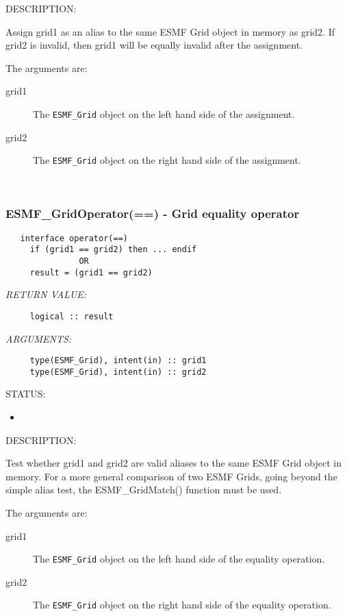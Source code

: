 {\sf DESCRIPTION:\\ }


     Assign grid1 as an alias to the same ESMF Grid object in memory
     as grid2. If grid2 is invalid, then grid1 will be equally invalid after
     the assignment.
  
     The arguments are:
     \begin{description}
     \item[grid1]
       The {\tt ESMF\_Grid} object on the left hand side of the assignment.
     \item[grid2]
       The {\tt ESMF\_Grid} object on the right hand side of the assignment.
     \end{description}
   
 
\mbox{}\hrulefill\ 
 
\subsubsection [ESMF\_GridOperator(==)] {ESMF\_GridOperator(==) - Grid equality operator}


  
\begin{verbatim}   interface operator(==)
     if (grid1 == grid2) then ... endif
               OR
     result = (grid1 == grid2)\end{verbatim}{\em RETURN VALUE:}
\begin{verbatim}     logical :: result\end{verbatim}{\em ARGUMENTS:}
\begin{verbatim}     type(ESMF_Grid), intent(in) :: grid1
     type(ESMF_Grid), intent(in) :: grid2\end{verbatim}
{\sf STATUS:}
   \begin{itemize}
   \item{}
   \end{itemize}
  
{\sf DESCRIPTION:\\ }


     Test whether grid1 and grid2 are valid aliases to the same ESMF
     Grid object in memory. For a more general comparison of two ESMF Grids,
     going beyond the simple alias test, the ESMF\_GridMatch() function
     must be used.
  
     The arguments are:
     \begin{description}
     \item[grid1]
       The {\tt ESMF\_Grid} object on the left hand side of the equality
       operation.
     \item[grid2]
       The {\tt ESMF\_Grid} object on the right hand side of the equality
       operation.
     \end{description}
   
